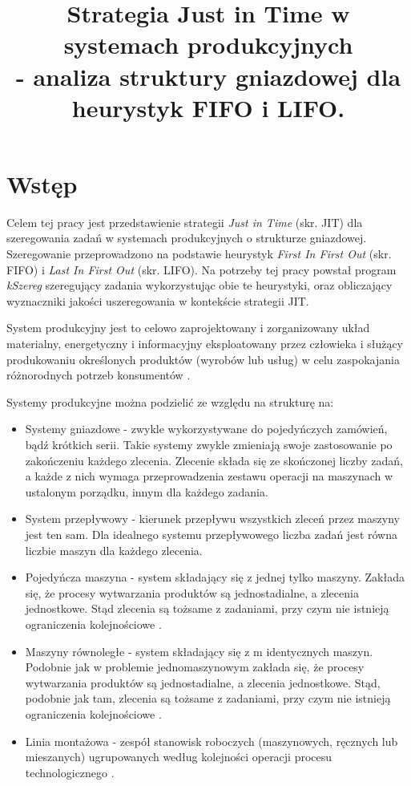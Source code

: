 \documentclass[twoside]{kInzynierka}
\title{Strategia Just in Time w systemach produkcyjnych\\ - analiza struktury gniazdowej dla heurystyk FIFO i LIFO.}
\begin{document}
%  

\section        {Wstęp}
Celem tej pracy jest przedstawienie strategii \emph{Just in Time} (skr. JIT) dla szeregowania zadań w systemach produkcyjnych o strukturze gniazdowej. Szeregowanie przeprowadzono na podstawie heurystyk \emph{First In First Out} (skr. FIFO) i \emph{Last In First Out} (skr. LIFO). Na potrzeby tej pracy powstał program \emph{kSzereg} szeregujący zadania wykorzystując obie te heurystyki, oraz obliczający wyznaczniki jakości uszeregowania w kontekście strategii JIT.

System produkcyjny jest to celowo zaprojektowany i zorganizowany układ materialny, energetyczny i informacyjny eksploatowany przez człowieka i służący produkowaniu określonych produktów (wyrobów lub usług) w celu zaspokajania różnorodnych potrzeb konsumentów \cite{pastuszak}.

Systemy produkcyjne można podzielić ze względu na strukturę na:

\begin{itemize}
\item Systemy gniazdowe - zwykle wykorzystywane do pojedyńczych zamówień, bądź krótkich serii. Takie systemy zwykle zmieniają swoje zastosowanie po zakończeniu każdego zlecenia. Zlecenie składa się ze skończonej liczby zadań, a każde z nich wymaga przeprowadzenia zestawu operacji na maszynach w ustalonym porządku, innym dla każdego zadania.
\item System przepływowy - kierunek przepływu wszystkich zleceń przez maszyny jest ten sam. Dla idealnego systemu przepływowego liczba zadań jest równa liczbie maszyn dla każdego zlecenia. \cite{grzechca}
\item Pojedyńcza maszyna - system składający się z jednej tylko maszyny. Zakłada się, że procesy wytwarzania produktów są jednostadialne, a zlecenia jednostkowe. Stąd zlecenia są tożsame z zadaniami, przy czym nie istnieją ograniczenia kolejnościowe \cite{grzechca}.
\item Maszyny równoległe - system składający się z m identycznych maszyn. Podobnie jak w problemie jednomaszynowym zakłada się, że procesy wytwarzania produktów są jednostadialne, a zlecenia jednostkowe. Stąd, podobnie jak tam, zlecenia są tożsame z zadaniami, przy czym nie istnieją ograniczenia kolejnościowe \cite{grzechca}.
\item Linia montażowa -  zespół stanowisk roboczych (maszynowych, ręcznych lub mieszanych) ugrupowanych według kolejności operacji procesu technologicznego \cite{wiki}.
\end{itemize}
\end{document}
